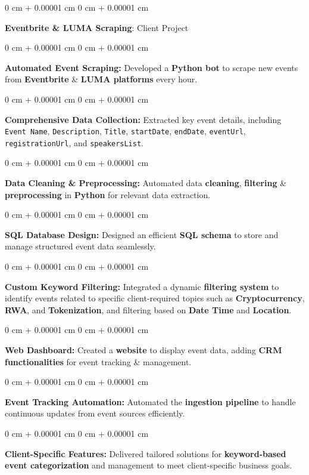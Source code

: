 \documentclass[10pt, letterpaper]{article}
\newenvironment{onecolentry}{
    \begin{adjustwidth}{
        0 cm + 0.00001 cm
    }{
        0 cm + 0.00001 cm
    }
}{
    \end{adjustwidth}
} %
\begin{document}
\begin{onecolentry}
  \textbf{\large Eventbrite \& LUMA Scraping}: Client Project
  \begin{onecolentry}
    \textbf{Automated Event Scraping:} Developed a \textbf{Python bot} to scrape new events from \textbf{Eventbrite} \& \textbf{LUMA platforms} every hour.
  \end{onecolentry}
  \begin{onecolentry}
    \textbf{Comprehensive Data Collection:} Extracted key event details, including \texttt{Event Name}, \texttt{Description}, \texttt{Title}, \texttt{startDate}, \texttt{endDate}, \texttt{eventUrl}, \texttt{registrationUrl}, and \texttt{speakersList}.
  \end{onecolentry}
  \begin{onecolentry}
    \textbf{Data Cleaning \& Preprocessing:} Automated data \textbf{cleaning}, \textbf{filtering} \& \textbf{preprocessing} in \textbf{Python} for relevant data extraction.
  \end{onecolentry}
  \begin{onecolentry}
    \textbf{SQL Database Design:} Designed an efficient \textbf{SQL schema} to store and manage structured event data seamlessly.
  \end{onecolentry}
  \begin{onecolentry}
    \textbf{Custom Keyword Filtering:} Integrated a dynamic \textbf{filtering system} to identify events related to specific client-required topics such as \textbf{Cryptocurrency}, \textbf{RWA}, and \textbf{Tokenization}, and filtering based on \textbf{Date Time} and \textbf{Location}.
  \end{onecolentry}
  \begin{onecolentry}
    \textbf{Web Dashboard:} Created a \textbf{website} to display event data, adding \textbf{CRM functionalities} for event tracking \& management.
  \end{onecolentry}
  \begin{onecolentry}
    \textbf{Event Tracking Automation:} Automated the \textbf{ingestion pipeline} to handle continuous updates from event sources efficiently.
  \end{onecolentry}
  \begin{onecolentry}
    \textbf{Client-Specific Features:} Delivered tailored solutions for \textbf{keyword-based event categorization} and management to meet client-specific business goals.
  \end{onecolentry}
\end{onecolentry}
\end{document}
